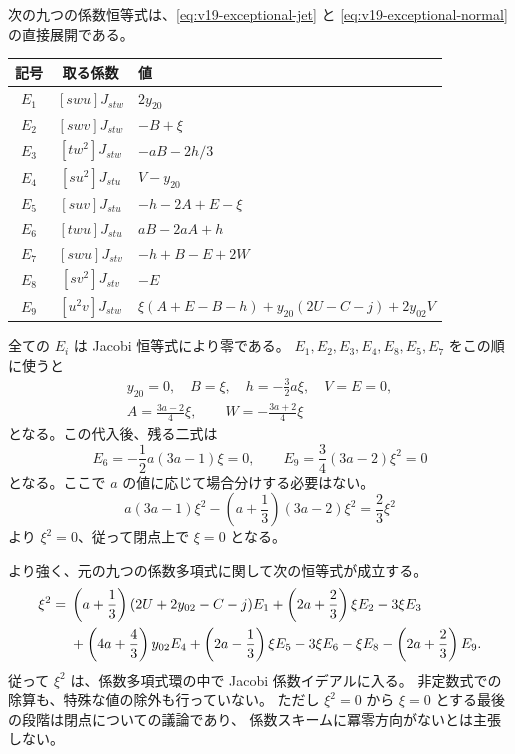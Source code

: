 \documentclass[11pt,a4paper]{ltjsarticle}
\theoremstyle{remark}\newtheorem{remark}[theorem]{注意}
\begin{document}
次の九つの係数恒等式は、\eqref{eq:v19-exceptional-jet} と
\eqref{eq:v19-exceptional-normal} の直接展開である。
\begin{center}
\begin{tabular}{ccl}
\hline
記号 & 取る係数 & 値\\
\hline
$E_1$ & $[swu]J_{stw}$ & $2y_{20}$\\
$E_2$ & $[swv]J_{stw}$ & $-B+\xi$\\
$E_3$ & $[tw^2]J_{stw}$ & $-aB-2h/3$\\
$E_4$ & $[su^2]J_{stu}$ & $V-y_{20}$\\
$E_5$ & $[suv]J_{stu}$ & $-h-2A+E-\xi$\\
$E_6$ & $[twu]J_{stu}$ & $aB-2aA+h$\\
$E_7$ & $[swu]J_{stv}$ & $-h+B-E+2W$\\
$E_8$ & $[sv^2]J_{stv}$ & $-E$\\
$E_9$ & $[u^2v]J_{stw}$ &
 $\xi(A+E-B-h)+y_{20}(2U-C-j)+2y_{02}V$\\
\hline
\end{tabular}
\end{center}

全ての $E_i$ は Jacobi 恒等式により零である。
$E_1,E_2,E_3,E_4,E_8,E_5,E_7$ をこの順に使うと
\begin{gather*}
 y_{20}=0,\quad B=\xi,\quad h=-\frac32a\xi,\quad V=E=0,\\
 A=\frac{3a-2}{4}\xi,\qquad W=-\frac{3a+2}{4}\xi
\end{gather*}
となる。この代入後、残る二式は
\begin{equation}\label{eq:v19-exceptional-two-relations}
 E_6=-\frac12a(3a-1)\xi=0,
 \qquad
 E_9=\frac34(3a-2)\xi^2=0
\end{equation}
となる。ここで $a$ の値に応じて場合分けする必要はない。
\[
 a(3a-1)\xi^2-\left(a+\frac13\right)(3a-2)\xi^2
                                  =\frac23\xi^2
\]
より $\xi^2=0$、従って閉点上で $\xi=0$ となる。

より強く、元の九つの係数多項式に関して次の恒等式が成立する。
\begin{align}
 \xi^2={}&\left(a+\frac13\right)(2U+2y_{02}-C-j)E_1
          +\left(2a+\frac23\right)\xi E_2-3\xi E_3\notag\\
 &+\left(4a+\frac43\right)y_{02}E_4
          +\left(2a-\frac13\right)\xi E_5-3\xi E_6
          -\xi E_8-\left(2a+\frac23\right)E_9.
 \label{eq:v19-exceptional-certificate}
\end{align}
従って $\xi^2$ は、係数多項式環の中で Jacobi 係数イデアルに入る。
非定数式での除算も、特殊な値の除外も行っていない。
ただし $\xi^2=0$ から $\xi=0$ とする最後の段階は閉点についての議論であり、
係数スキームに冪零方向がないとは主張しない。
\end{document}
